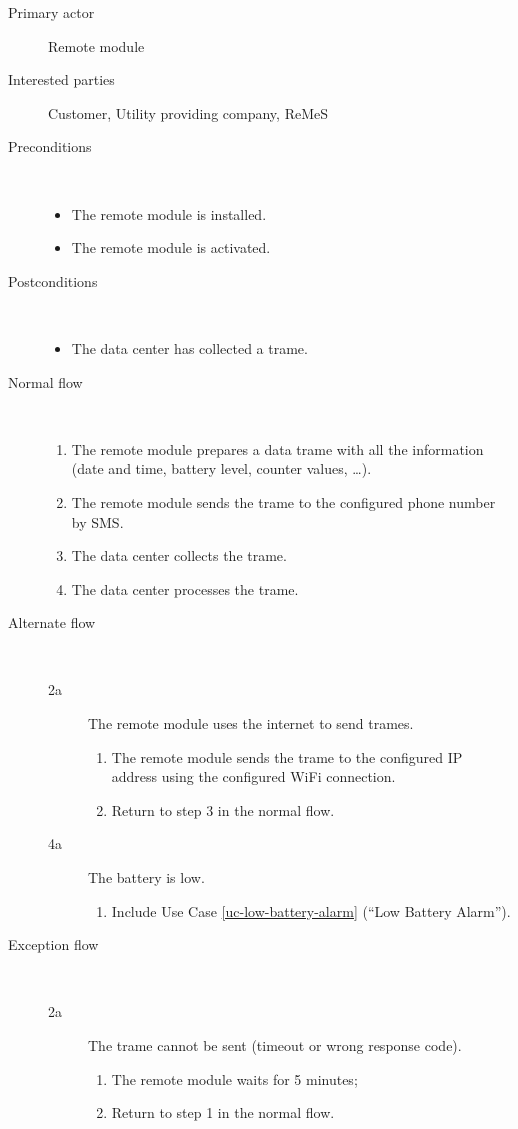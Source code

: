 \begin{description}
	\item[Primary actor] Remote module
	\item[Interested parties] Customer, Utility providing company, ReMeS
	\item[Preconditions] \ 
	\begin{itemize}
		\item The remote module is installed.
		\item The remote module is activated.
	\end{itemize}
	\item[Postconditions] \ 
	\begin{itemize}
		\item The data center has collected a trame.
	\end{itemize}
	\item[Normal flow] \ 
	\begin{enumerate}
		\item The remote module prepares a data trame with all the information (date
		and time, battery level, counter values, \ldots).
		\item The remote module sends the trame to the configured phone number by SMS.
		\item The data center collects the trame.
		\item The data center processes the trame.
	\end{enumerate}
	\item[Alternate flow] \ 
	\begin{description}
		\item[2a] The remote module uses the internet to send trames.
		\begin{enumerate}
			\item The remote module sends the trame to the configured IP address using
			the configured WiFi connection.
			\item Return to step 3 in the normal flow.
		\end{enumerate}
		\item[4a] The battery is low.
		\begin{enumerate}
			\item Include Use Case \ref{uc-low-battery-alarm} (``Low Battery Alarm'').
		\end{enumerate}
	\end{description}
	\item[Exception flow] \ 
	\begin{description}
		\item[2a] The trame cannot be sent (timeout or wrong response code).
		\begin{enumerate}
			\item The remote module waits for 5 minutes;
			\item Return to step 1 in the normal flow.  
		\end{enumerate}
	\end{description}
\end{description}